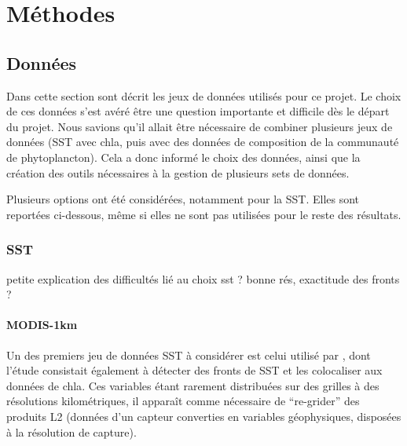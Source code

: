 \documentclass[index]{subfiles}
\begin{document}
\chapter{Méthodes}
\label{chp:methodes}

\tocsubfile

\section{Données}
\label{sec:donnees}

Dans cette section sont décrit les jeux de données utilisés pour ce projet.
Le choix de ces données s'est avéré être une question importante et difficile dès le départ du projet.
Nous savions qu'il allait être nécessaire de combiner plusieurs jeux de données (\gls{SST} avec \gls{chla}, puis avec des données de composition de la communauté de phytoplancton).
Cela a donc informé le choix des données, ainsi que la création des outils nécessaires à la gestion de plusieurs sets de données.

Plusieurs options ont été considérées, notamment pour la \gls{SST}.
Elles sont reportées ci-dessous, même si elles ne sont pas utilisées pour le reste des résultats.

\subsection{SST}
\label{sec:donnees-sst}

petite explication des difficultés lié au choix sst ?
bonne rés, exactitude des fronts ?

\subsubsection{MODIS-1km}
\label{sec:donnees-sst-modis}

Un des premiers jeu de données \gls{SST} à considérer est celui utilisé par \textcite{liu_2016}, dont l'étude consistait également à détecter des fronts de \gls{SST} et les colocaliser aux données de \gls{chla}.
Ces variables étant rarement distribuées sur des grilles à des résolutions kilométriques, il apparaît comme nécessaire de \enquote{re-grider} des produits L2 (données d'un capteur converties en variables géophysiques, disposées à la résolution de capture).
\end{document}
